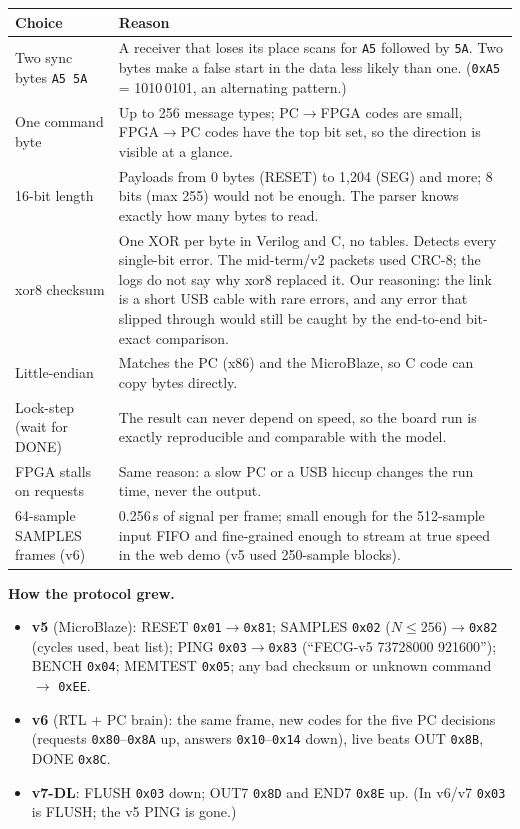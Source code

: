 \documentclass[11pt]{article}
\begin{document}
\begin{center}
\small
\begin{tabularx}{\linewidth}{@{}l X@{}}
\toprule
\textbf{Choice} & \textbf{Reason} \\
\midrule
Two sync bytes \texttt{A5 5A} & A receiver that loses its place scans for \texttt{A5} followed by \texttt{5A}. Two bytes make a false start in the data less likely than one. (\texttt{0xA5} = 1010\,0101, an alternating pattern.) \\
One command byte & Up to 256 message types; PC$\to$FPGA codes are small, FPGA$\to$PC codes have the top bit set, so the direction is visible at a glance. \\
16-bit length & Payloads from 0 bytes (RESET) to 1,204 (SEG) and more; 8 bits (max 255) would not be enough. The parser knows exactly how many bytes to read. \\
xor8 checksum & One XOR per byte in Verilog and C, no tables. Detects every single-bit error. The mid-term/v2 packets used CRC-8; the logs do not say why xor8 replaced it. Our reasoning: the link is a short USB cable with rare errors, and any error that slipped through would still be caught by the end-to-end bit-exact comparison. \\
Little-endian & Matches the PC (x86) and the MicroBlaze, so C code can copy bytes directly. \\
Lock-step (wait for DONE) & The result can never depend on speed, so the board run is exactly reproducible and comparable with the model. \\
FPGA stalls on requests & Same reason: a slow PC or a USB hiccup changes the run time, never the output. \\
64-sample SAMPLES frames (v6) & 0.256\,s of signal per frame; small enough for the 512-sample input FIFO and fine-grained enough to stream at true speed in the web demo (v5 used 250-sample blocks). \\
\bottomrule
\end{tabularx}
\end{center}

\textbf{How the protocol grew.}
\begin{itemize}
  \item \textbf{v5} (MicroBlaze): RESET \texttt{0x01}$\to$\texttt{0x81}; SAMPLES \texttt{0x02} ($N\le256$)$\to$\texttt{0x82} (cycles used, beat list); PING \texttt{0x03}$\to$\texttt{0x83} (``FECG-v5 73728000 921600''); BENCH \texttt{0x04}; MEMTEST \texttt{0x05}; any bad checksum or unknown command $\to$ \texttt{0xEE}.
  \item \textbf{v6} (RTL + PC brain): the same frame, new codes for the five PC decisions (requests \texttt{0x80}--\texttt{0x8A} up, answers \texttt{0x10}--\texttt{0x14} down), live beats OUT \texttt{0x8B}, DONE \texttt{0x8C}.
  \item \textbf{v7-DL}: FLUSH \texttt{0x03} down; OUT7 \texttt{0x8D} and END7 \texttt{0x8E} up. (In v6/v7 \texttt{0x03} is FLUSH; the v5 PING is gone.)
\end{itemize}
\end{document}
